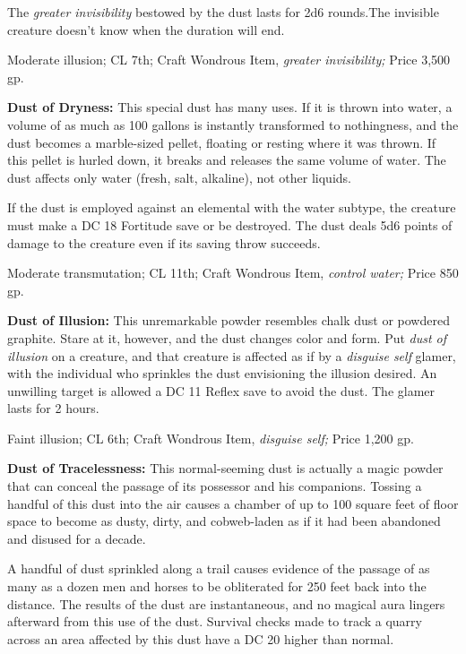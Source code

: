 \documentclass{article}
\begin{document}
The \textit{greater invisibility }bestowed by the dust lasts for 2d6 rounds.The 
invisible creature doesn't know when the duration will end.

Moderate illusion; CL 7th; Craft Wondrous Item, \textit{greater invisibility; }Price 
3,500 gp.

\textbf{Dust of Dryness:} This special dust has many uses. If it is thrown into 
water, a volume of as much as 100 gallons is instantly transformed to nothingness, 
and the dust becomes a marble-sized pellet, floating or resting where it was thrown. 
If this pellet is hurled down, it breaks and releases the same volume of water. 
The dust affects only water (fresh, salt, alkaline), not other liquids.

If the dust is employed against an elemental with the water subtype, the creature 
must make a DC 18 Fortitude save or be destroyed. The dust deals 5d6 points of 
damage to the creature even if its saving throw succeeds.

Moderate transmutation; CL 11th; Craft Wondrous Item, \textit{control water; }Price 
850 gp.

\textbf{Dust of Illusion:} This unremarkable powder resembles chalk dust or powdered 
graphite. Stare at it, however, and the dust changes color and form. Put \textit{dust 
of illusion }on a creature, and that creature is affected as if by a \textit{disguise 
self }glamer, with the individual who sprinkles the dust envisioning the illusion 
desired. An unwilling target is allowed a DC 11 Reflex save to avoid the dust. 
The glamer lasts for 2 hours.

Faint illusion; CL 6th; Craft Wondrous Item, \textit{disguise self; }Price 1,200 
gp.

\textbf{Dust of Tracelessness:} This normal-seeming dust is actually a magic powder 
that can conceal the passage of its possessor and his companions. Tossing a handful 
of this dust into the air causes a chamber of up to 100 square feet of floor space 
to become as dusty, dirty, and cobweb-laden as if it had been abandoned and disused 
for a decade.

A handful of dust sprinkled along a trail causes evidence of the passage of as 
many as a dozen men and horses to be obliterated for 250 feet back into the distance. 
The results of the dust are instantaneous, and no magical aura lingers afterward 
from this use of the dust. Survival checks made to track a quarry across an area 
affected by this dust have a DC 20 higher than normal.
\end{document}
